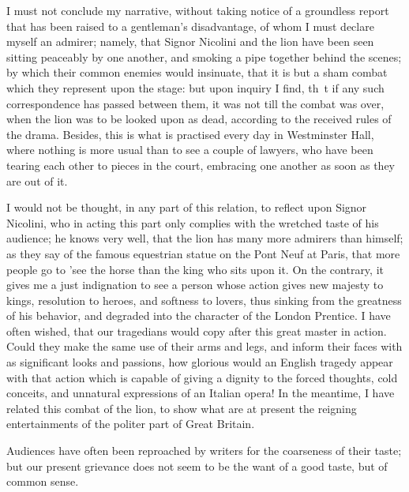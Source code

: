 I must not conclude my narrative, without taking notice of a groundless report that has been raised to a gentleman's disadvantage, of whom I must declare myself an admirer; namely, that Signor Nicolini and the lion have been seen sitting peaceably by one another, and smoking a pipe together behind the scenes; by which their common enemies would insinuate, that it is but a sham combat which they represent upon the stage: but upon inquiry I find, th~t if any such correspondence has passed between them, it was not till the combat was over, when the lion was to be looked upon as dead, according to the received rules of the drama. Besides, this is what is practised every day in Westminster Hall, where nothing is more usual than to see a couple of lawyers, who have been tearing each other to pieces in the court, embracing one another as soon as they are out of it.

I would not be thought, in any part of this relation, to reflect upon Signor Nicolini, who in acting this part only complies with the wretched taste of his audience; he knows very well, that the lion has many more admirers than himself; as they say of the famous equestrian statue on the Pont Neuf at Paris, that more people go to 'see the horse than the king who sits upon it. On the contrary, it gives me a just indignation to see a person whose action gives new majesty to kings, resolution to heroes, and softness to lovers, thus sinking from the greatness of his behavior, and degraded into the character of the London Prentice. I have often wished, that our tragedians would copy after this great master in action. Could they make the same use of their arms and legs, and inform their faces with as significant looks and passions, how glorious would an English tragedy appear with that action which is capable of giving a dignity to the forced thoughts, cold conceits, and unnatural expressions of an Italian opera! In the meantime, I have related this combat of the lion, to show what are at present the reigning entertainments of the politer part of Great Britain.

Audiences have often been reproached by writers for the coarseness of their taste; but our present grievance does not seem to be the want of a good taste, but of common sense.